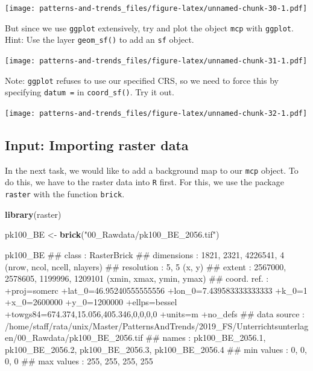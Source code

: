 \documentclass[]{book}
\newenvironment{Shaded}{\begin{snugshade}}{\end{snugshade}}
\newcommand{\KeywordTok}[1]{\textcolor[rgb]{0.13,0.29,0.53}{\textbf{#1}}}
\newcommand{\StringTok}[1]{\textcolor[rgb]{0.31,0.60,0.02}{#1}}
\newcommand{\NormalTok}[1]{#1}
\begin{document}
\texttt{[image: patterns-and-trends\_files/figure-latex/unnamed-chunk-30-1.pdf]}

But since we use \texttt{ggplot} extensively, try and plot the object
\texttt{mcp} with \texttt{ggplot}. Hint: Use the layer
\texttt{geom\_sf()} to add an \texttt{sf} object.

\texttt{[image: patterns-and-trends\_files/figure-latex/unnamed-chunk-31-1.pdf]}

Note: \texttt{ggplot} refuses to use our specified CRS, so we need to
force this by specifying \texttt{datum\ =} in \texttt{coord\_sf()}. Try
it out.

\texttt{[image: patterns-and-trends\_files/figure-latex/unnamed-chunk-32-1.pdf]}

\subsection{Input: Importing raster
data}\label{input-importing-raster-data}

In the next task, we would like to add a background map to our
\texttt{mcp} object. To do this, we have to the raster data into
\texttt{R} first. For this, we use the package \texttt{raster} with the
function \texttt{brick}.

\begin{Shaded}
\begin{Highlighting}[]

\KeywordTok{library}\NormalTok{(raster)}

\NormalTok{pk100_BE <-}\StringTok{ }\KeywordTok{brick}\NormalTok{(}\StringTok{"00_Rawdata/pk100_BE_2056.tif"}\NormalTok{)}

\NormalTok{pk100_BE}
\NormalTok{## class       : RasterBrick }
\NormalTok{## dimensions  : 1821, 2321, 4226541, 4  (nrow, ncol, ncell, nlayers)}
\NormalTok{## resolution  : 5, 5  (x, y)}
\NormalTok{## extent      : 2567000, 2578605, 1199996, 1209101  (xmin, xmax, ymin, ymax)}
\NormalTok{## coord. ref. : +proj=somerc +lat_0=46.95240555555556 +lon_0=7.439583333333333 +k_0=1 +x_0=2600000 +y_0=1200000 +ellps=bessel +towgs84=674.374,15.056,405.346,0,0,0,0 +units=m +no_defs }
\NormalTok{## data source : /home/staff/rata/unix/Master/PatternsAndTrends/2019_FS/Unterrichtsunterlagen/00_Rawdata/pk100_BE_2056.tif }
\NormalTok{## names       : pk100_BE_2056.1, pk100_BE_2056.2, pk100_BE_2056.3, pk100_BE_2056.4 }
\NormalTok{## min values  :               0,               0,               0,               0 }
\NormalTok{## max values  :             255,             255,             255,             255}
\end{Highlighting}
\end{Shaded}
\end{document}
